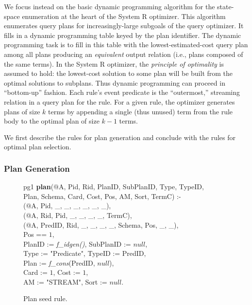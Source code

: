 We focus instead on the basic dynamic programming algorithm for the
state-space enumeration at the heart of the System R optimizer.  This
algorithm enumerates query plans for increasingly-large subgoals of the
query optimizer.  It fills in a dynamic programming table keyed by the
plan identifier.  The dynamic programming task is
to fill in this table with the lowest-estimated-cost query plan among
all plans producing an {\em equivalent} output relation (i.e., plans
composed of the same terms).  
In the System R optimizer, the {\em principle of
optimality} is assumed to hold: the lowest-cost solution to some
plan will be built from the optimal solutions to subplans.  Thus dynamic
programming can proceed in ``bottom-up'' fashion.  Each rule's event
predicate is the ``outermost,'' streaming relation in a query plan for the rule.  For a given rule,
the optimizer generates plans of size $k$ terms by appending a single
(thus unused)
term from the rule body to the optimal plan of
size $k-1$ terms.

We first describe the rules for plan generation and conclude with the
rules for optimal plan selection.

\subsubsection{Plan Generation}
\label{ch:evita:sec:plangen}

\begin{figure}
\ssp
\centering
\begin{boxedminipage}{\linewidth}
pg1 {\bf plan}(@A, Pid, Rid, PlanID, SubPlanID, Type, TypeID, \\
\datalogspace \xspace \xspace Plan, Schema, Card, Cost, Pos, AM, Sort, TermC) :- \\
(@A, Pid, \_, \_, \_, \_, \_, \_),\\
(@A, Rid, Pid, \_, \_, \_, \_, TermC),\\
(@A, PredID, Rid, \_, \_, \_, \_, Schema, Pos, \_, \_),\\
\datalogspace Pos == $1$,\\
\datalogspace PlanID := {\em f\_idgen()}, SubPlanID := $null$,\\
\datalogspace Type := "Predicate", TypeID := PredID,\\
\datalogspace Plan := {\em f\_cons}(PredID, $null$),\\
\datalogspace Card := $1$, Cost := $1$,\\
\datalogspace AM := "STREAM", Sort := $null$.
\end{boxedminipage}
\caption{\label{ch:evita:fig:planseed}Plan seed rule.}
\end{figure}

